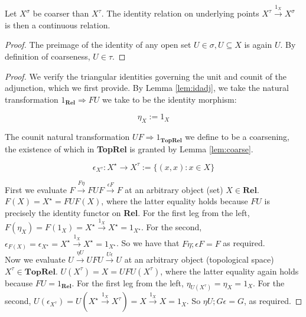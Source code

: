 \begin{lemma}\label{lem:coarse}
Let $X^\sigma$ be coarser than $X^\tau$. The identity relation on underlying points $X^\tau \overset{1_X}{\rightarrow} X^\sigma$ is then a continuous relation.
\begin{proof}
The preimage of the identity of any open set $U \in \sigma, U \subseteq X$ is again $U$. By definition of coarseness, $U \in \tau$.
\end{proof}
\end{lemma}

\begin{proposition}[$F \dashv U$]
\begin{proof}
We verify the triangular identities governing the unit and counit of the adjunction, which we first provide. By Lemma \ref{lem:idadj}, we take the natural transformation $1_\mathbf{Rel} \Rightarrow FU$ we take to be the identity morphism:

\[\eta_{X} := 1_{X}\]

The counit natural transformation $UF \Rightarrow 1_{\mathbf{TopRel}}$ we define to be a coarsening, the existence of which in \textbf{TopRel} is granted by Lemma \ref{lem:coarse}.

\[\epsilon_{X^\tau} : X^\star \rightarrow X^\tau := \{(x,x) : x \in X\}\]

First we evaluate $F \overset{F\eta}{\rightarrow} FUF \overset{\epsilon F}{\rightarrow} F$ at an arbitrary object (set) $X \in \textbf{Rel}$. $F(X) = X^\star = FUF(X)$, where the latter equality holds because $FU$ is precisely the identity functor on \textbf{Rel}. For the first leg from the left, $F(\eta_X) = F(1_X) = X^\star \overset{1_X}{\rightarrow} X^\star = 1_{X^\star}$. For the second, $\epsilon_{F(X)} = \epsilon_{X^\star} = X^\star \overset{1_X}{\rightarrow} X^\star = 1_{X^\star}$. So we have that $F\eta ; \epsilon F = F$ as required.\\

Now we evaluate $U \overset{\eta U}{\rightarrow} UFU \overset{U \epsilon}{\rightarrow} U$ at an arbitrary object (topological space) $X^\tau \in \textbf{TopRel}$. $U(X^\tau) = X = UFU(X^\tau)$, where the latter equality again holds because $FU = 1_\textbf{Rel}$. For the first leg from the left, $\eta_{U(X^\tau)} = \eta_X = 1_{X}$. For the second, $U(\epsilon_{X^\tau}) = U(X^\star \overset{1_X}{\rightarrow} X^\tau) = X \overset{1_X}{\rightarrow} X = 1_X$. So $\eta U ; G \epsilon = G$, as required.
\end{proof}
\end{proposition}

